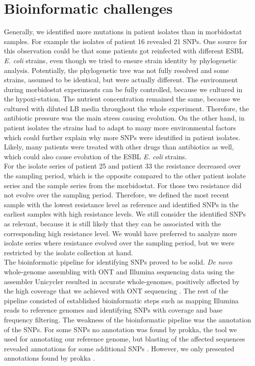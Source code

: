 \section{Bioinformatic challenges}
Generally, we identified more mutations in patient isolates than in morbidostat samples. For example the isolates of patient 16 revealed 21 SNPs. One source for this observation  could be that some patients got reinfected with different ESBL \textit{E. coli} strains, even though we tried to ensure strain identity by phylogenetic analysis. Potentially, the phylogenetic tree was not fully resolved and some strains, assumed to be identical, but were actually different. The environment during morbidostat experiments can be fully controlled, because we cultured in the hypoxi-station. The nutrient concentration remained the same, because we cultured with diluted LB media throughout the whole experiment. Therefore, the antibiotic pressure was the main stress causing evolution. On the other hand, in patient isolates the strains had to adapt to many more environmental factors which could further explain why more SNPs were identified in patient isolates. Likely, many patients were treated with other drugs than antibiotics as well, which could also cause evolution of the ESBL \textit{E. coli} strains. \\
For the isolate series of patient 25 and patient 33 the resistance decreased over the sampling period, which is the opposite compared to the other patient isolate series and the sample series from the morbidostat. For those two resistance did not evolve over the sampling period. Therefore, we defined the most recent sample with the lowest resistance level as reference and identified SNPs in the earliest samples with high resistance levels. We still consider the identified SNPs as relevant, because it is still likely that they can be associated with the corresponding high resistance level. We would have preferred to analyze more isolate series where resistance evolved over the sampling period, but we were restricted by the isolate collection at hand. \\
The bioinformatic pipeline for identifying SNPs proved to be solid. \textit{De novo} whole-genome assembling with ONT and Illumina sequencing data using the assembler Unicycler resulted in accurate whole-genomes, positively affected by the high coverage that we achieved with ONT sequencing \cite{wick_unicycler:_2017}. The rest of the pipeline consisted of established bioinformatic steps such as mapping Illumina reads to reference genomes and identifying SNPs with coverage and base frequency filtering. The weakness of the bioinformatic pipeline was the annotation of the SNPs. For some SNPs no annotation was found by prokka, the tool we used for annotating our reference genome, but blasting of the affected sequences revealed annotations for some additional SNPs \cite{seemann_prokka:_2014}.
However, we only presented annotations found by prokka \cite{seemann_prokka:_2014}.

